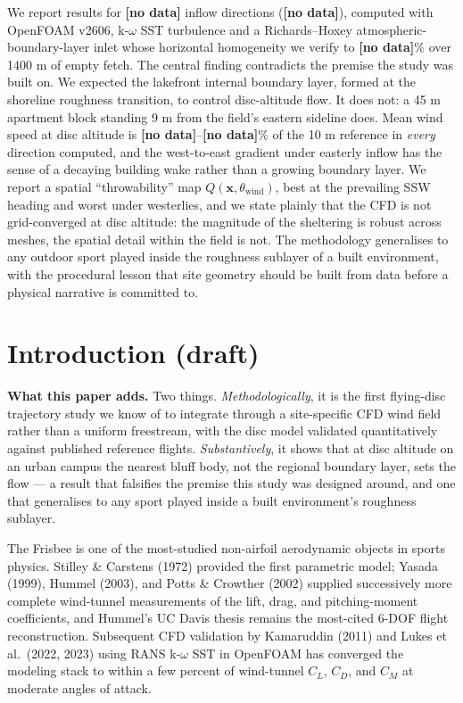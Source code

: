 \documentclass[11pt,letterpaper]{article}
\newcommand{\MISSINGNUM}{\textbf{\color{red}[no data]}}%
\newcommand{\ABLdrift}{\MISSINGNUM}\newcommand{\ABLverdict}{\MISSINGNUM}%
\newcommand{\UfieldFracMin}{\MISSINGNUM}\newcommand{\UfieldFracMax}{\MISSINGNUM}%
\newcommand{\Ndirections}{\MISSINGNUM}\newcommand{\DirectionList}{\MISSINGNUM}%
\begin{document}
We report results for \Ndirections{} inflow directions (\DirectionList),
computed with OpenFOAM v2606, k-$\omega$ SST turbulence and a Richards--Hoxey
atmospheric-boundary-layer inlet whose horizontal homogeneity we verify to
\ABLdrift\% over 1400 m of empty fetch. The central finding contradicts the
premise the study was built on. We expected the lakefront internal boundary
layer, formed at the shoreline roughness transition, to control disc-altitude
flow. It does not: a 45 m apartment block standing 9 m from the field's eastern
sideline does. Mean wind speed at disc altitude is \UfieldFracMin--\UfieldFracMax\% of the
10 m reference in \emph{every} direction computed, and the west-to-east gradient
under easterly inflow has the sense of a decaying building wake rather than a
growing boundary layer. We report a spatial ``throwability'' map
$Q(\mathbf{x}, \theta_{\text{wind}})$, best at the prevailing SSW heading and
worst under westerlies, and we state plainly that the CFD is not grid-converged
at disc altitude: the magnitude of the sheltering is robust across meshes, the
spatial detail within the field is not. The methodology generalises to any
outdoor sport played inside the roughness sublayer of a built environment, with
the procedural lesson that site geometry should be built from data before a
physical narrative is committed to.

\section{Introduction (draft)}

\begin{tcolorbox}[colback=boxbg,colframe=accent2,boxrule=0.6pt,left=6pt,
                  right=6pt,top=4pt,bottom=4pt]
\small\textbf{What this paper adds.} Two things. \emph{Methodologically}, it is
the first flying-disc trajectory study we know of to integrate through a
site-specific CFD wind field rather than a uniform freestream, with the disc
model validated quantitatively against published reference flights.
\emph{Substantively}, it shows that at disc altitude on an urban campus the
nearest bluff body, not the regional boundary layer, sets the flow --- a
result that falsifies the premise this study was designed around, and one that
generalises to any sport played inside a built environment's roughness
sublayer.
\end{tcolorbox}

The Frisbee is one of the most-studied non-airfoil aerodynamic objects in sports physics. Stilley \& Carstens (1972) provided the first parametric model; Yasada (1999), Hummel (2003), and Potts \& Crowther (2002) supplied successively more complete wind-tunnel measurements of the lift, drag, and pitching-moment coefficients, and Hummel's UC Davis thesis remains the most-cited 6-DOF flight reconstruction. Subsequent CFD validation by Kamaruddin (2011) and Lukes et al.\ (2022, 2023) using RANS k-$\omega$ SST in OpenFOAM has converged the modeling stack to within a few percent of wind-tunnel $C_L$, $C_D$, and $C_M$ at moderate angles of attack.
\end{document}
